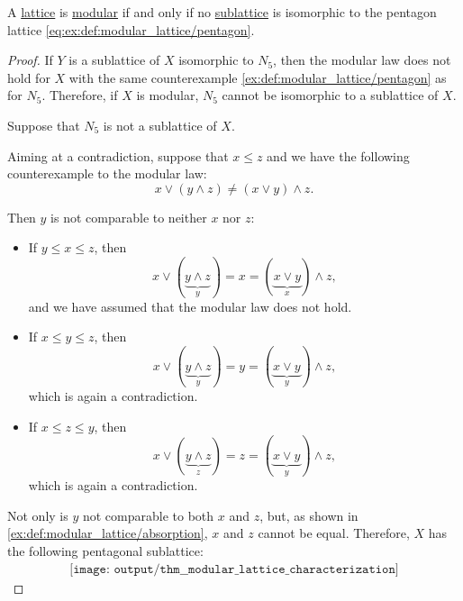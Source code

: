 \begin{proposition}\label{thm:modular_lattice_characterization}
  A \hyperref[def:lattice]{lattice} is \hyperref[def:modular_lattice]{modular} if and only if no \hyperref[def:lattice/submodel]{sublattice} is isomorphic to the pentagon lattice \eqref{eq:ex:def:modular_lattice/pentagon}.
\end{proposition}
\begin{proof}
  \SufficiencySubProof If \( Y \) is a sublattice of \( X \) isomorphic to \( N_5 \), then the modular law does not hold for \( X \) with the same counterexample \cref{ex:def:modular_lattice/pentagon} as for \( N_5 \). Therefore, if \( X \) is modular, \( N_5 \) cannot be isomorphic to a sublattice of \( X \).

  \NecessitySubProof Suppose that \( N_5 \) is not a sublattice of \( X \).

  Aiming at a contradiction, suppose that \( x \leq z \) and we have the following counterexample to the modular law:
  \begin{equation*}
    x \vee (y \wedge z) \neq (x \vee y) \wedge z.
  \end{equation*}

  Then \( y \) is not comparable to neither \( x \) nor \( z \):
  \begin{itemize}
    \item If \( y \leq x \leq z \), then
    \begin{equation*}
      x \vee (\underbrace{y \wedge z}_{y}) = x = (\underbrace{x \vee y}_{x}) \wedge z,
    \end{equation*}
    and we have assumed that the modular law does not hold.

    \item If \( x \leq y \leq z \), then
    \begin{equation*}
      x \vee (\underbrace{y \wedge z}_{y}) = y = (\underbrace{x \vee y}_{y}) \wedge z,
    \end{equation*}
    which is again a contradiction.

    \item If \( x \leq z \leq y \), then
    \begin{equation*}
      x \vee (\underbrace{y \wedge z}_{z}) = z = (\underbrace{x \vee y}_{y}) \wedge z,
    \end{equation*}
    which is again a contradiction.
  \end{itemize}

  Not only is \( y \) not comparable to both \( x \) and \( z \), but, as shown in \cref{ex:def:modular_lattice/absorption}, \( x \) and \( z \) cannot be equal. Therefore, \( X \) has the following pentagonal sublattice:
  \begin{equation}\label{eq:thm:modular_lattice_characterization/pentagonal}
    \begin{aligned}
      \texttt{[image: output/thm\_\_modular\_lattice\_characterization]}
    \end{aligned}
  \end{equation}


\end{proof}

